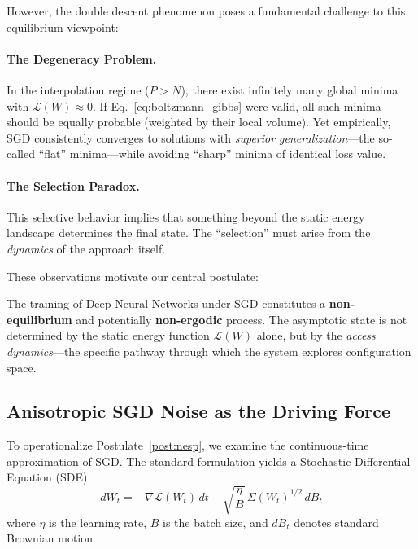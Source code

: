 \documentclass[
  journal=largetwo,
  year=2025,
  volume=37,
]{cup-journal}
\begin{document}
However, the double descent phenomenon poses a fundamental challenge to this equilibrium viewpoint:

\paragraph{The Degeneracy Problem.} In the interpolation regime ($P > N$), there exist infinitely many global minima with $\mathcal{L}(W) \approx 0$. If Eq.~\eqref{eq:boltzmann_gibbs} were valid, all such minima should be equally probable (weighted by their local volume). Yet empirically, SGD consistently converges to solutions with \textit{superior generalization}---the so-called ``flat'' minima---while avoiding ``sharp'' minima of identical loss value.

\paragraph{The Selection Paradox.} This selective behavior implies that something beyond the static energy landscape determines the final state. The ``selection'' must arise from the \textit{dynamics} of the approach itself.

These observations motivate our central postulate:

\begin{postulate}\label{post:nesp}
The training of Deep Neural Networks under SGD constitutes a \textbf{non-equilibrium} and potentially \textbf{non-ergodic} process. The asymptotic state is not determined by the static energy function $\mathcal{L}(W)$ alone, but by the \textit{access dynamics}---the specific pathway through which the system explores configuration space.
\end{postulate}

\subsection{Anisotropic SGD Noise as the Driving Force}

To operationalize Postulate~\ref{post:nesp}, we examine the continuous-time approximation of SGD. The standard formulation yields a Stochastic Differential Equation (SDE):
\begin{equation}\label{eq:langevin_sgd}
    dW_t = -\nabla \mathcal{L}(W_t) \, dt + \sqrt{\frac{\eta}{B}} \, \Sigma(W_t)^{1/2} \, dB_t
\end{equation}
where $\eta$ is the learning rate, $B$ is the batch size, and $dB_t$ denotes standard Brownian motion.
\end{document}
